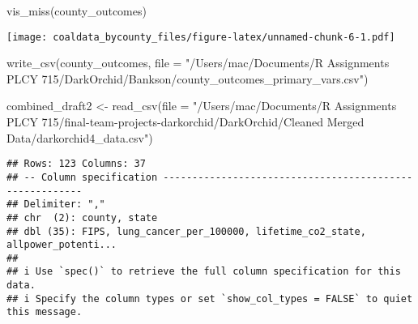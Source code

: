 \documentclass[
]{article}
\newenvironment{Shaded}{\begin{snugshade}}{\end{snugshade}}
\newcommand{\AttributeTok}[1]{\textcolor[rgb]{0.77,0.63,0.00}{#1}}
\newcommand{\FunctionTok}[1]{\textcolor[rgb]{0.00,0.00,0.00}{#1}}
\newcommand{\NormalTok}[1]{#1}
\newcommand{\OtherTok}[1]{\textcolor[rgb]{0.56,0.35,0.01}{#1}}
\newcommand{\StringTok}[1]{\textcolor[rgb]{0.31,0.60,0.02}{#1}}
\begin{document}
\begin{Shaded}
\begin{Highlighting}[]
\FunctionTok{vis\_miss}\NormalTok{(county\_outcomes)}
\end{Highlighting}
\end{Shaded}

\texttt{[image: coaldata\_bycounty\_files/figure-latex/unnamed-chunk-6-1.pdf]}

\begin{Shaded}
\begin{Highlighting}[]
\FunctionTok{write\_csv}\NormalTok{(county\_outcomes, }\AttributeTok{file =} \StringTok{"/Users/mac/Documents/R Assignments PLCY 715/DarkOrchid/Bankson/county\_outcomes\_primary\_vars.csv"}\NormalTok{)}
\end{Highlighting}
\end{Shaded}

\begin{Shaded}
\begin{Highlighting}[]
\NormalTok{combined\_draft2 }\OtherTok{\textless{}{-}} \FunctionTok{read\_csv}\NormalTok{(}\AttributeTok{file =} \StringTok{"/Users/mac/Documents/R Assignments PLCY 715/final{-}team{-}projects{-}darkorchid/DarkOrchid/Cleaned Merged Data/darkorchid4\_data.csv"}\NormalTok{)}
\end{Highlighting}
\end{Shaded}

\begin{verbatim}
## Rows: 123 Columns: 37
## -- Column specification --------------------------------------------------------
## Delimiter: ","
## chr  (2): county, state
## dbl (35): FIPS, lung_cancer_per_100000, lifetime_co2_state, allpower_potenti...
## 
## i Use `spec()` to retrieve the full column specification for this data.
## i Specify the column types or set `show_col_types = FALSE` to quiet this message.
\end{verbatim}
\end{document}
